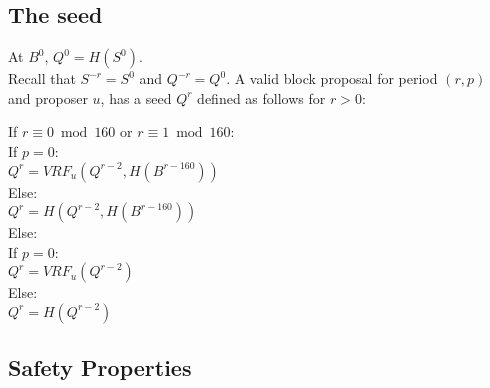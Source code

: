 \documentclass[../main.tex]{subfiles}
\begin{document}
\subsection{The seed} \label{subsection:SeedFormula}
At $B^0$, $Q^0 = H(S^0)$.\\
Recall that $S^{-r}=S^0$ and $Q^{-r}=Q^0$. A valid block proposal for period $(r,p)$ and proposer $u$, has a seed $Q^r$ defined as follows for $r>0$:
\begin{tabbing}
If $r \equiv 0 \bmod 160$ or $r \equiv 1 \bmod 160$:\\
\hspace{5mm}If $p=0$:\\
\hspace{10mm}$Q^r=VRF_u(Q^{r-2},H(B^{r-160}))$\\
\hspace{5mm}Else:\\
\hspace{10mm}$Q^r=H(Q^{r-2},H(B^{r-160}))$\\
Else:\\
\hspace{5mm}If $p=0$:\\
\hspace{10mm}$Q^r=VRF_u(Q^{r-2})$\\
\hspace{5mm}Else:\\
\hspace{10mm}$Q^r=H(Q^{r-2})$\\
\end{tabbing}

\subsection{Safety Properties}
\label{subsection:SafetyConditions}
\end{document}
